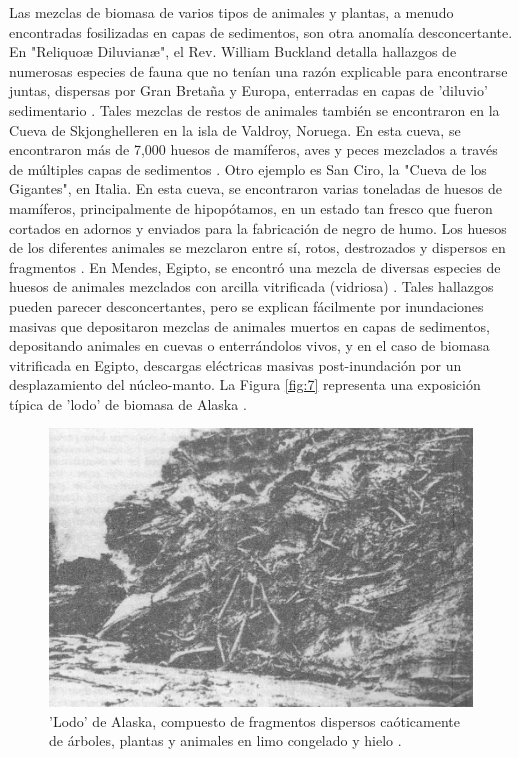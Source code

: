 \documentclass[10pt,twocolumn,letterpaper]{article}
\begin{document}
Las mezclas de biomasa de varios tipos de animales y plantas, a menudo encontradas fosilizadas en capas de sedimentos, son otra anomalía desconcertante. En "Reliquoæ Diluvianæ", el Rev. William Buckland detalla hallazgos de numerosas especies de fauna que no tenían una razón explicable para encontrarse juntas, dispersas por Gran Bretaña y Europa, enterradas en capas de 'diluvio' sedimentario \cite{58}. Tales mezclas de restos de animales también se encontraron en la Cueva de Skjonghelleren en la isla de Valdroy, Noruega. En esta cueva, se encontraron más de 7,000 huesos de mamíferos, aves y peces mezclados a través de múltiples capas de sedimentos \cite{59}. Otro ejemplo es San Ciro, la "Cueva de los Gigantes", en Italia. En esta cueva, se encontraron varias toneladas de huesos de mamíferos, principalmente de hipopótamos, en un estado tan fresco que fueron cortados en adornos y enviados para la fabricación de negro de humo. Los huesos de los diferentes animales se mezclaron entre sí, rotos, destrozados y dispersos en fragmentos \cite{60,61}. En Mendes, Egipto, se encontró una mezcla de diversas especies de huesos de animales mezclados con arcilla vitrificada (vidriosa) \cite{57}. Tales hallazgos pueden parecer desconcertantes, pero se explican fácilmente por inundaciones masivas que depositaron mezclas de animales muertos en capas de sedimentos, depositando animales en cuevas o enterrándolos vivos, y en el caso de biomasa vitrificada en Egipto, descargas eléctricas masivas post-inundación por un desplazamiento del núcleo-manto. La Figura \ref{fig:7} representa una exposición típica de 'lodo' de biomasa de Alaska \cite{56}.

\begin{figure}[t]
\begin{center}
   \includegraphics[width=1\linewidth]{muck-crop.jpeg}
\end{center}
   \caption{'Lodo' de Alaska, compuesto de fragmentos dispersos caóticamente de árboles, plantas y animales en limo congelado y hielo \cite{146}.}
\label{fig:7}
\label{fig:onecol}
\end{figure}
\end{document}
